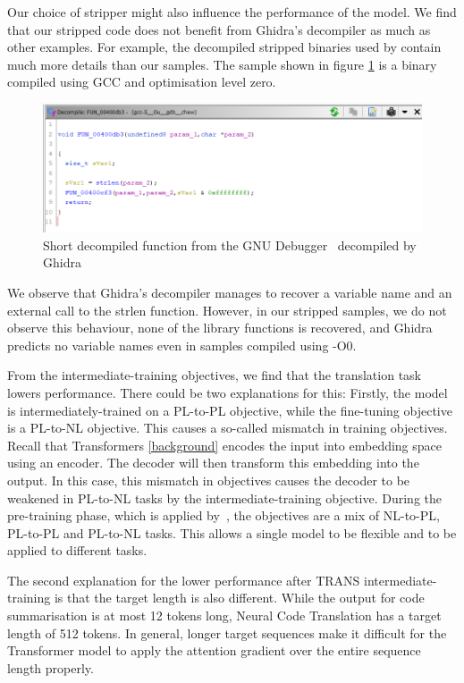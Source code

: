 Our choice of stripper might also influence the performance of the model. We find that our stripped code does not benefit from Ghidra's decompiler as much as other examples. For example, the decompiled stripped binaries used by \citeauthor{Nero} contain much more details than our samples. The sample shown in figure \ref{fig:Nero} is a binary compiled using GCC and optimisation level zero.

\begin{figure}[!h]
  \centering
  \includegraphics[width=\linewidth]{img/Nero.png}
  \caption{Short decompiled function from the GNU Debugger~\cite{Nero} decompiled by Ghidra}
  \label{fig:Nero}
\end{figure}

We observe that Ghidra's decompiler manages to recover a variable name and an external call to the strlen function. However, in our stripped samples, we do not observe this behaviour, none of the library functions is recovered, and Ghidra predicts no variable names even in samples compiled using -O0.

From the intermediate-training objectives, we find that the translation task lowers performance. There could be two explanations for this: Firstly, the model is intermediately-trained on a PL-to-PL objective, while the fine-tuning objective is a PL-to-NL objective. This causes a so-called mismatch in training objectives. Recall that Transformers \ref{background} encodes the input into embedding space using an encoder. The decoder will then transform this embedding into the output. In this case, this mismatch in objectives causes the decoder to be weakened in PL-to-NL tasks by the intermediate-training objective. During the pre-training phase, which is applied by~\citeauthor{CodeT5}, the objectives are a mix of NL-to-PL, PL-to-PL and PL-to-NL tasks. This allows a single model to be flexible and to be applied to different tasks.

The second explanation for the lower performance after TRANS intermediate-training is that the target length is also different. While the output for code summarisation is at most 12 tokens long, Neural Code Translation has a target length of 512 tokens. In general, longer target sequences make it difficult for the Transformer model to apply the attention gradient over the entire sequence length properly.

